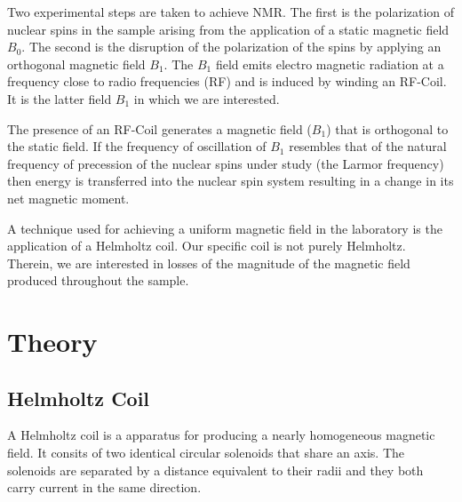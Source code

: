 \documentclass[%
 reprint,
 amsmath,
 amssymb,
 aps,
]{revtex4-1}
\begin{document}

	Two experimental steps are taken to achieve NMR. The first is the polarization of nuclear spins in the sample arising from the application of a static magnetic field $B_0$. The second is the disruption of the polarization of the spins by applying an orthogonal magnetic field $B_1$. The $B_1$ field emits electro magnetic radiation at a frequency close to radio frequencies (RF) and is induced by winding an RF-Coil. It is the latter field $B_1$ in which we are interested. 
	
	
	The presence of an RF-Coil generates a magnetic field ($B_1$) that is orthogonal to the static field. If the frequency of oscillation of $B_1$ resembles that of the natural frequency of precession of the nuclear spins under study (the Larmor frequency) then energy is transferred into the nuclear spin system resulting in a change in its net magnetic moment. 
	
	A technique used for achieving a uniform magnetic field in the laboratory is the application of a Helmholtz coil. Our specific coil is not purely Helmholtz. Therein, we are interested in losses of the magnitude of the magnetic field produced throughout the sample.  
	
	
	
	




\section{\label{sec:level1}Theory}

	\subsection{\label{sec:level2} Helmholtz Coil}
	


	
	
	
	A Helmholtz coil is a apparatus for producing a nearly homogeneous magnetic field. It consits of two identical circular solenoids that share an axis. The solenoids are separated by a distance equivalent to their radii and they both carry current in the same direction. 
	
\end{document}
